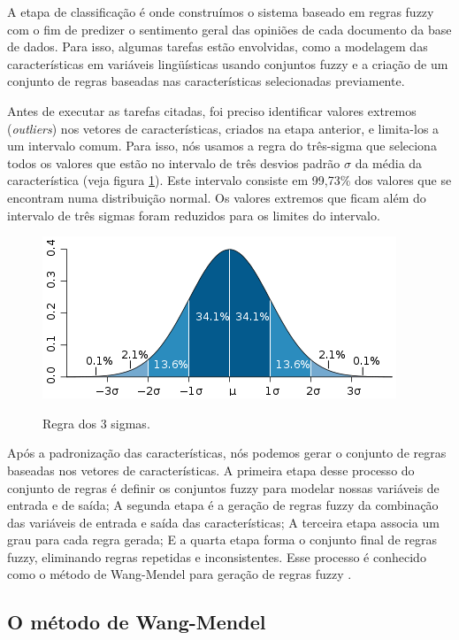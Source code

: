 A etapa de classificação é onde construímos o sistema baseado em regras fuzzy com o fim de predizer o sentimento geral das opiniões de cada documento da base de dados. Para isso, algumas tarefas estão envolvidas, como a modelagem das características em variáveis lingüísticas usando conjuntos fuzzy \cite{zadeh1965fuzzy} e a criação de um conjunto de regras baseadas nas características selecionadas previamente.

Antes de executar as tarefas citadas, foi preciso identificar valores extremos (\textit{outliers}) nos vetores de características, criados na etapa anterior, e limita-los a um intervalo comum. Para isso, nós usamos a regra do três-sigma \cite{kazmier2004schaum} que seleciona todos os valores que estão no intervalo de três desvios padrão $\sigma$ da média da característica (veja figura \ref{figura:regra_3_sigmas}). Este intervalo consiste em 99,73\% dos valores que se encontram numa distribuição normal. Os valores extremos que ficam além do intervalo de três sigmas foram reduzidos para os limites do intervalo.

\begin{figure}[h]
\caption{Regra dos 3 sigmas.}
\centering
\includegraphics[scale=0.85]{regra-dos-3-sigma.png}
\label{figura:regra_3_sigmas}
\end{figure}

Após a padronização das características, nós podemos gerar o conjunto de regras baseadas nos vetores de características. A primeira etapa desse processo do conjunto de regras é definir os conjuntos fuzzy \cite{zadeh1965fuzzy} para modelar nossas variáveis de entrada e de saída;  A segunda etapa é a geração de regras fuzzy da combinação das variáveis de entrada e saída das características; A terceira etapa associa um grau para cada regra gerada; E a quarta etapa forma o conjunto final de regras fuzzy, eliminando regras repetidas e inconsistentes. Esse processo é conhecido como o método de Wang-Mendel para geração de regras fuzzy \cite{wang1992generating}. 

\subsection{O método de Wang-Mendel}

